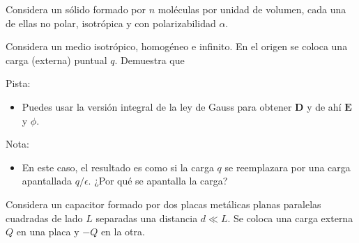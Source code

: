 \documentclass{exam}
\begin{document}
\begin{questions}
  \question Considera un sólido formado por $n$ moléculas por unidad
  de volumen, cada una de ellas no polar, isotrópica y con polarizabilidad $\alpha$.

  \question Considera un medio isotrópico, homogéneo e infinito. En el
  origen se coloca una carga (externa) puntual $q$. Demuestra que
  Pista:
  \begin{itemize}
  \item Puedes usar la versión integral de la ley de Gauss para
    obtener $\bm D$ y de ahí $\bm E$ y $\phi$.
  \end{itemize}
  Nota:
  \begin{itemize}
  \item En este caso, el resultado es como si la carga $q$ se
    reemplazara por una carga apantallada $q/\epsilon$. ¿Por qué se
    apantalla la carga?
  \end{itemize}
  \question Considera un capacitor formado por dos placas metálicas planas
  paralelas cuadradas de lado $L$ separadas una distancia $d\ll L$. Se
  coloca una carga externa $Q$ en una placa y $-Q$ en la otra.
  \begin{parts}

\end{parts}
\end{questions}
\end{document}
